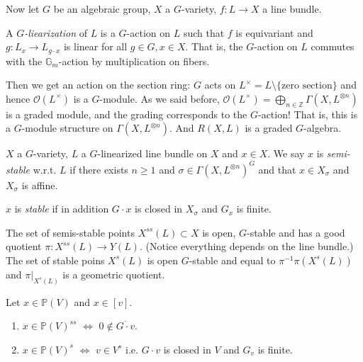 \medskip\noindent
Now let $G$ be an algebraic group, $X$ a
$G$-variety, $f:L \to X$ a line bundle.

\begin{definition}
\label{definition-G-linearization}
A  {\it $G$-liearization} of $L$ is a
$G$-action on $L$ such that $f$ is
equivariant and $g:L_x \to L_{g\cdot x}$ is
linear for all $g \in G, x \in X$. That is,
the $G$-action on $L$ commutes with the
$\mathbb{G}_m$-action by multiplication on
fibers.
\end{definition}

Then we get an action on the section ring:
$G$ acts on $L^{\times}=L\setminus
\{\text{zero section}\}$ and hence
$\mathcal{O}(L^{\times})$ is a $G$-module. As
we said before,
$\mathcal{O}(L^{\times})=\bigoplus_{n \in
\mathbb{Z}}\Gamma(X,L^{\otimes n})$ is a
graded module, and the grading corresponds to
the $G$-action! That is, this is a $G$-module
structure on $\Gamma(X,L^{\otimes n})$. And
$R(X,L)$ is a graded $G$-algebra.

\begin{definition}
\label{definition-semi-stable-line-bundle}
$X$ a $G$-variety, $L$ a $G$-linearized line
bundle on $X$ and $x \in X$. We say $x$ is
{\it semi-stable} w.r.t. $L$ if there exists
$n \geq 1$ and $\sigma \in
\Gamma(X,L^{\otimes n})^G$ and that $x \in
X_\sigma$ and $X_\sigma$ is affine.

$x$ is  {\it stable} if in addition $G\cdot
x$ is closed in $X_\sigma$ and $G_x$ is
finite.
\end{definition}

\begin{theorem}[Mumford]
\label{theorem-Mumford}
The set of semis-stable points
$X^{ss}(L)\subset X$ is open, $G$-stable and
has a good quotient $\pi:X^{ss}(L) \to Y(L)$.
(Notice everything depends on the line
bundle.) The set of stable poins $X^s(L)$ is
open $G$-stable and equal to
$\pi^{-1}\pi(X^s(L))$ and $\pi|_{X^s(L)}$ is
a geometric quotient.
\end{theorem}

\begin{proposition}
\label{proposition-on-projectivization-of-V}
Let $x \in \mathbb{P}(V)$ and $x \in [v]$.
\begin{enumerate}
\item $x \in \mathbb{P}(V)^{ss}$ $\iff$ $0
\not \in \overline{G\cdot v}$.
\item $x\in \mathbb{P}(V)^s$ $\iff$ $v \in
V^s$ i.e. $G\cdot v$ is closed in $V$
and $G_v$ is finite.
\end{enumerate}
\end{proposition}


